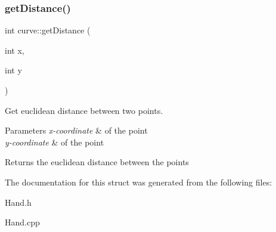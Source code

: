 \subsubsection{\texorpdfstring{get\+Distance()}{getDistance()}}
{\footnotesize\ttfamily int curve\+::get\+Distance (\begin{DoxyParamCaption}\item[{int}]{x,  }\item[{int}]{y }\end{DoxyParamCaption})}



Get euclidean distance between two points. 


\begin{DoxyParams}{Parameters}
{\em x-\/coordinate} & of the point \\
\hline
{\em y-\/coordinate} & of the point \\
\hline
\end{DoxyParams}
\begin{DoxyReturn}{Returns}
the euclidean distance between the points 
\end{DoxyReturn}


The documentation for this struct was generated from the following files\+:\begin{DoxyCompactItemize}
\item 
Hand.\+h\item 
Hand.\+cpp\end{DoxyCompactItemize}
